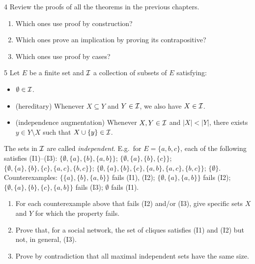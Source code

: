 \begin{exercise}{4}
    Review the proofs of all the theorems in the previous chapters.
    \begin{enumerate}[label=(\alph*)]
        \item Which ones use proof by construction?
        \item Which ones prove an implication by proving its contrapositive?
        \item Which ones use proof by cases?
    \end{enumerate}
\end{exercise}

\begin{exercise}{5}
    Let $E$ be a finite set and $\mathcal{I}$ a collection of subsets of $E$ satisfying:
    \begin{itemize}
        \item[(I1)] $\emptyset\in\mathcal{I}$.
        \item[(I2)] (hereditary) Whenever $X\subseteq Y$ and $Y\in\mathcal{I}$, we also
                    have $X\in\mathcal{I}$.
        \item[(I3)] (independence augmentation) Whenever $X,Y\in\mathcal{I}$ and
                    $|X|<|Y|$, there exists $y\in Y\setminus X$ such that
                    $X\cup\{y\}\in\mathcal{I}$.
    \end{itemize}
    The sets in $\mathcal{I}$ are called \emph{independent}. E.g.\ for $E=\{a,b,c\}$, each
    of the following satisfies (I1)--(I3):
    $\{\emptyset,\{a\},\{b\},\{a,b\}\}$;
    $\{\emptyset,\{a\},\{b\},\{c\}\}$;
    $\{\emptyset,\{a\},\{b\},\{c\},\{a,c\},\{b,c\}\}$;
    $\{\emptyset,\{a\},\{b\},\{c\},\{a,b\},\{a,c\},\{b,c\}\}$;
    $\{\emptyset\}$.
    Counterexamples:
    $\{\{a\},\{b\},\{a,b\}\}$ fails (I1), (I2);
    $\{\emptyset,\{a\},\{a,b\}\}$ fails (I2);
    $\{\emptyset,\{a\},\{b\},\{c\},\{a,b\}\}$ fails (I3);
    $\emptyset$ fails (I1).
    \begin{enumerate}[label=(\alph*)]
        \item For each counterexample above that fails (I2) and/or (I3), give
              specific sets $X$ and $Y$ for which the property fails.
        \item Prove that, for a social network, the set of cliques satisfies (I1)
              and (I2) but not, in general, (I3).
        \item Prove by contradiction that all maximal independent sets have the
              same size.
    \end{enumerate}

\end{exercise}
